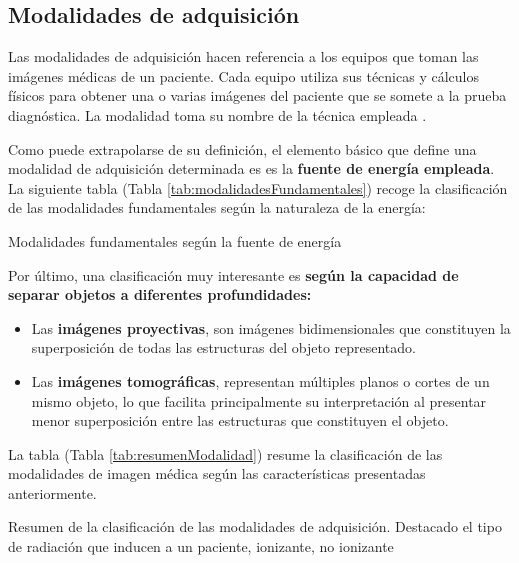 \subsection{Modalidades de adquisición}
Las modalidades de adquisición hacen referencia a los equipos que toman las imágenes médicas de un paciente. Cada equipo utiliza sus técnicas y cálculos físicos para obtener una o varias imágenes del paciente que se somete a la prueba diagnóstica. La modalidad toma su nombre de la técnica empleada \cite{4}.

Como puede extrapolarse de su definición, el elemento básico que define una modalidad de adquisición determinada es es la \textbf{fuente de energía empleada}. La siguiente tabla (Tabla \ref{tab:modalidadesFundamentales}) recoge la clasificación de las modalidades fundamentales según la naturaleza de la energía:
\begin{table}[hp]
\centering{
\small
}
\caption{Modalidades fundamentales según la fuente de energía}
\label{modalidadesFundamentales}
\end{table}

Por último, una clasificación muy interesante es \textbf{según la capacidad de separar objetos a diferentes profundidades:}
\begin{itemize}
\item Las \textbf{imágenes proyectivas}, son imágenes bidimensionales que constituyen la superposición de todas las estructuras del objeto representado.
\item Las \textbf{imágenes tomográficas}, representan múltiples planos o cortes de un mismo objeto, lo que facilita principalmente su interpretación al presentar menor superposición entre las estructuras que constituyen el objeto.
\end{itemize}
La tabla (Tabla \ref{tab:resumenModalidad}) resume la clasificación de las modalidades de imagen médica según las características presentadas anteriormente.

\begin{table}[hp]
\centering{
\small
}
\caption{Resumen de la clasificación de las modalidades de adquisición. Destacado el tipo de radiación que inducen a un paciente, ionizante, no ionizante}
\label{resumenModalidad}
\end{table}

